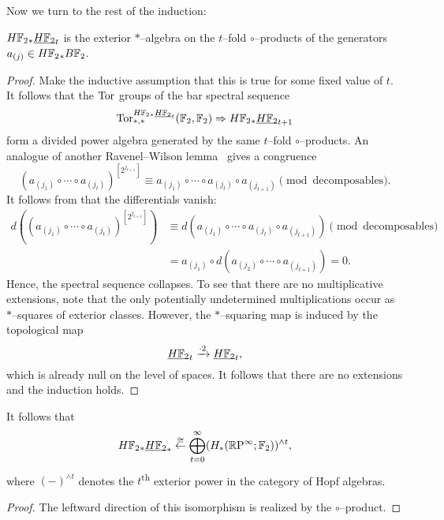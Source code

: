Now we turn to the rest of the induction:
\begin{theorem}\label{UnstableSteenrodInduction}
$H\mathbb F_2{}_* \underline{\smash{H\mathbb F_2}}_{t}$ is the exterior $\ast$--algebra on the $t$--fold $\circ$--products of the generators $a_{(j)} \in H\mathbb F_2{}_* B\mathbb F_2$.
\end{theorem}
\begin{proof}
Make the inductive assumption that this is true for some fixed value of $t$.  It follows that the $\operatorname{Tor}$ groups of the bar spectral sequence \[\operatorname{Tor}^{H\mathbb F_2{}_* \underline{\smash{H\mathbb F_2}}_{t}}_{*, *}(\mathbb F_2, \mathbb F_2) \Rightarrow H\mathbb F_2{}_* \underline{\smash{H\mathbb F_2}}_{t+1}\] form a divided power algebra generated by the same $t$--fold $\circ$--products.  An analogue of another Ravenel--Wilson lemma~\cite[Lemma 9.5]{RavenelWilsonKthyOfEMSpaces} gives a congruence \[(a_{(j_1)} \circ \cdots \circ a_{(j_t)})^{[2^{j_{t+1}}]} \equiv a_{(j_1)} \circ \cdots \circ a_{(j_t)} \circ a_{(j_{t+1})} \pmod{\text{decomposables}}.\]  It follows from  that the differentials vanish:
\begin{align*}
d((a_{(j_1)} \circ \cdots \circ a_{(j_t)})^{[2^{j_{t+1}}]}) & \equiv d(a_{(j_1)} \circ \cdots \circ a_{(j_t)} \circ a_{(j_{t+1})}) \pmod{\text{decomposables}} \\
& = a_{(j_1)} \circ d(a_{(j_2)} \circ \cdots \circ a_{(j_{t+1})}) = 0.
\end{align*}
Hence, the spectral sequence collapses.  To see that there are no multiplicative extensions, note that the only potentially undetermined multiplications occur as $\ast$--squares of exterior classes.  However, the $\ast$--squaring map is induced by the topological map \[\underline{\smash{H\mathbb F_2}}_{t} \xrightarrow{\cdot 2} \underline{\smash{H\mathbb F_2}}_{t},\] which is already null on the level of spaces.  It follows that there are no extensions and the induction holds.
\end{proof}

\begin{corollary}
It follows that \[H\mathbb F_2{}_* \underline{\smash{H\mathbb F_2}}_{*} \stackrel\cong\leftarrow \bigoplus_{t=0}^\infty (H_*(\mathbb R\mathrm P^\infty; \mathbb F_2))^{\wedge t},\] where $(-)^{\wedge t}$ denotes the $t$\textsuperscript{th} exterior power in the category of Hopf algebras.
\end{corollary}
\begin{proof}
The leftward direction of this isomorphism is realized by the $\circ$--product.
\end{proof}

